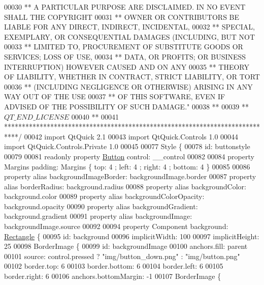\begin{DoxyCode}
00030 \textcolor{stringliteral}{** A PARTICULAR PURPOSE ARE DISCLAIMED. IN NO EVENT SHALL THE COPYRIGHT}
00031 \textcolor{stringliteral}{** OWNER OR CONTRIBUTORS BE LIABLE FOR ANY DIRECT, INDIRECT, INCIDENTAL,}
00032 \textcolor{stringliteral}{** SPECIAL, EXEMPLARY, OR CONSEQUENTIAL DAMAGES (INCLUDING, BUT NOT}
00033 \textcolor{stringliteral}{** LIMITED TO, PROCUREMENT OF SUBSTITUTE GOODS OR SERVICES; LOSS OF USE,}
00034 \textcolor{stringliteral}{** DATA, OR PROFITS; OR BUSINESS INTERRUPTION) HOWEVER CAUSED AND ON ANY}
00035 \textcolor{stringliteral}{** THEORY OF LIABILITY, WHETHER IN CONTRACT, STRICT LIABILITY, OR TORT}
00036 \textcolor{stringliteral}{** (INCLUDING NEGLIGENCE OR OTHERWISE) ARISING IN ANY WAY OUT OF THE USE}
00037 \textcolor{stringliteral}{** OF THIS SOFTWARE, EVEN IF ADVISED OF THE POSSIBILITY OF SUCH DAMAGE."}
00038 **
00039 ** $QT\_END\_LICENSE$
00040 **
00041 ****************************************************************************/
00042 \textcolor{keyword}{import} QtQuick 2.1
00043 import QtQuick.Controls 1.0
00044 import QtQuick.Controls.Private 1.0
00045 
00077 Style \{
00078     \textcolor{keywordtype}{id}: buttonstyle
00079 
00081     readonly \textcolor{keyword}{property} \hyperlink{classButton}{Button} control: \_\_control
00082 
00084     \textcolor{keyword}{property} Margins padding: Margins \{ top: 4 ; left: 4 ; right: 4 ; bottom: 4 \}
00085 
00086     \textcolor{keyword}{property} alias backgroundImageBorder: backgroundImage.border
00087     \textcolor{keyword}{property} alias borderRadius: background.radius
00088     \textcolor{keyword}{property} alias backgroundColor: background.color
00089     \textcolor{keyword}{property} alias backgroundColorOpacity: background.opacity
00090     \textcolor{keyword}{property} alias backgroundGradient: background.gradient
00091     \textcolor{keyword}{property} alias backgroundImage: backgroundImage.source
00092 
00094     \textcolor{keyword}{property} Component background: \hyperlink{classRectangle}{Rectangle} \{
00095         \textcolor{keywordtype}{id}: background
00096         implicitWidth: 100
00097         implicitHeight: 25
00098         BorderImage \{
00099             \textcolor{keywordtype}{id}: backgroundImage
00100             anchors.fill: parent
00101             source: control.pressed ? \textcolor{stringliteral}{"img/button\_down.png"} : \textcolor{stringliteral}{"img/button.png"}
00102             border.top: 6
00103             border.bottom: 6
00104             border.left: 6
00105             border.right: 6
00106             anchors.bottomMargin: -1
00107             BorderImage \{

\end{DoxyCode}
